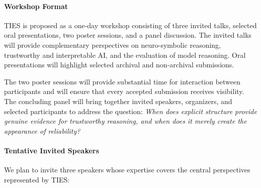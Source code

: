 \documentclass[11pt]{article}
\begin{document}



\paragraph{Workshop Format}

TIES is proposed as a one-day workshop consisting of three invited
talks, selected oral presentations, two poster sessions, and a panel
discussion. The invited talks will provide complementary perspectives
on neuro-symbolic reasoning, trustworthy and interpretable AI, and the
evaluation of model reasoning. Oral presentations will highlight
selected archival and non-archival submissions.

The two poster sessions will provide substantial time for interaction
between participants and will ensure that every accepted submission
receives visibility. The concluding panel will bring together invited
speakers, organizers, and selected participants to address the
question: \textit{When does explicit structure provide genuine evidence
for trustworthy reasoning, and when does it merely create the
appearance of reliability?}

\paragraph{Tentative Invited Speakers}

We plan to invite three speakers whose expertise covers the central
perspectives represented by TIES:
\end{document}
